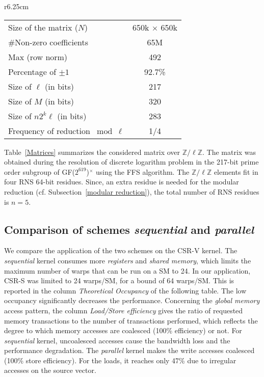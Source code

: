 \documentclass[runningheads,orivec]{llncs}
\begin{document}
\begin{wraptable}[8]{r}{6.25cm}
\vspace*{-1cm}
  \centering
    \begin{tabular}{|l||c|}
      \hline
      \small Size of the matrix ($N$) & \footnotesize 650k $\times$ 650k\\
      \small \#Non-zero coefficients & \footnotesize 65M\\
      \small Max (row norm) &\footnotesize 492\\
      \small Percentage of $\pm1$ & \footnotesize 92.7\%\\
      \small Size of $\ell$ (in bits)& \footnotesize 217\\
      \small Size of $M$ (in bits)& \footnotesize 320\\
      \small Size of $n2^k{\ell}$ (in bits)& \footnotesize 283\\
      \small Frequency of reduction $\bmod \ell$ & \footnotesize 1/4\\      
      \hline
    \end{tabular}
  \caption{ \small{Properties of test matrix}}
  \label{Matrices}
\end{wraptable}

Table~\ref{Matrices} summarizes the considered matrix over $\mathbb{Z}/{\ell}\mathbb{Z}$. The matrix was obtained during the resolution of discrete logarithm problem in the 217-bit prime order subgroup of GF($2^{619}$)$^\times$ using the FFS algorithm. The $\mathbb{Z}/{\ell}\mathbb{Z}$ elements fit in four RNS 64-bit residues. Since, an extra residue is needed for the modular reduction (cf. Subsection~\ref{modular reduction}), the total number of RNS residues is $n=5$.

\vspace*{-0.25cm}
\subsection{Comparison of schemes \textit{sequential} and \textit{parallel}}
\vspace*{-0.25cm}

We compare the application of the two schemes on the CSR-V kernel. The \textit{sequential} kernel consumes more \textit{registers} and \textit{shared memory}, which limits the maximum number of warps that can be run on a SM to 24. In our application, CSR-S was limited to 24 warps/SM, for a bound of 64 warps/SM. This is reported in the column \textit{Theoretical Occupancy} of the following table. The low occupancy significantly decreases the performance. Concerning the \textit{global memory} access pattern, the column \textit{Load/Store efficiency} gives the ratio of requested memory transactions to the number of transactions performed, which reflects the degree to which memory accesses are coalesced (100\% efficiency) or not. For \textit{sequential} kernel, uncoalesced accesses cause the bandwidth loss and the performance degradation. The \textit{parallel} kernel makes the write accesses coalesced (100\% store efficiency). For the loads, it reaches only 47\% due to irregular accesses on the source vector. 
\end{document}
